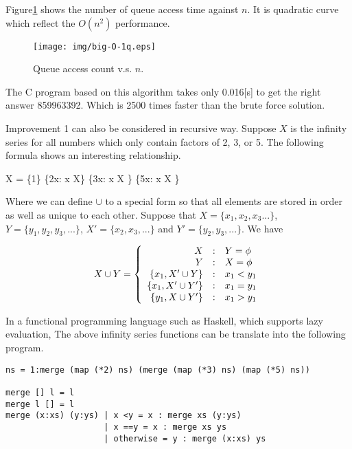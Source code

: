 \documentclass[UTF8]{article}
\begin{document}
Figure\ref{fig:big-O-1q} shows the number of queue access time against $n$.
It is quadratic curve which reflect the $O(n^2)$ performance.

\begin{figure}[htbp]
       \begin{center}
       	  \texttt{[image: img/big-O-1q.eps]}
        \caption{Queue access count v.s. $n$.} \label{fig:big-O-1q}
       \end{center}
\end{figure}

The C program based on this algorithm takes only 0.016[s] to get the right answer
859963392. Which is 2500 times faster than the brute force solution.

Improvement 1 can also be considered in recursive way. Suppose $X$ is the infinity
series for all numbers which only contain factors of 2, 3, or 5. The following
formula shows an interesting relationship.

\be
  X = \{1\} \cup \{2x: \forall x \in X\} \cup \{3x: \forall x \in X \} \cup \{5x: \forall x \in X \}
\ee

Where we can define $\cup$ to a special form so that all elements are stored in order
as well as unique to each other. Suppose that $X=\{x_1, x_2, x_3...\}$, $Y=\{y_1, y_2, y_3, ...\}$, $X' = \{x_2, x_3, ...\}$ and $Y'=\{y_2, y_3, ...\}$. We have

\[
X \cup Y = \left \{
  \begin{array}{r@{\quad:\quad}l}
  X & Y = \phi \\
  Y & X = \phi \\
  \{ x_1, X' \cup Y \} & x_1 < y_1 \\
  \{ x_1, X' \cup Y' \} & x_1 = y_1 \\
  \{ y_1, X \cup Y' \} & x_1 > y_1
  \end{array}
\right.
\]

In a functional programming language such as Haskell, which supports
lazy evaluation, The above infinity series functions can be translate
into the following program.

\lstset{language=Haskell}
\begin{lstlisting}
ns = 1:merge (map (*2) ns) (merge (map (*3) ns) (map (*5) ns))

merge [] l = l
merge l [] = l
merge (x:xs) (y:ys) | x <y = x : merge xs (y:ys)
                    | x ==y = x : merge xs ys
                    | otherwise = y : merge (x:xs) ys
\end{lstlisting}
\end{document}
